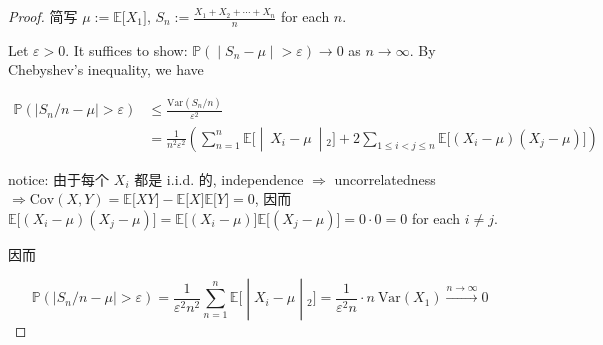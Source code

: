 \begin{proof}

简写 \(\mathit{\mu} := \mathbb{E}\lbrack\mathit{X}_{1}\rbrack\), \(\mathit{S}_{\mathit{n}} := \frac{\mathit{X}_{1} + \mathit{X}_{2} + \cdots + \mathit{X}_{\mathit{n}}}{\mathit{n}}\) for each \(\mathit{n}\).

Let \(\mathit{\varepsilon} > 0\). It suffices to show: \(\left. \mathbb{P}( \middle| \mathit{S}_{\mathit{n}} - \mathit{\mu} \middle| > \mathit{\varepsilon})\rightarrow 0 \right.\) as \(\mathit{n}\rightarrow\infty\). By Chebyshev's inequality, we have

\[\begin{matrix}
{\mathbb{P}\left( {\left| {\mathit{S}_{\mathit{n}}/\mathit{n} - \mathit{\mu}} \right| > \mathit{\varepsilon}} \right)} & {\leq \frac{\text{Var}(\mathit{S}_{\mathit{n}}/\mathit{n})}{\mathit{\varepsilon}^{2}}} \\
 & {= \frac{1}{\mathit{n}^{2}\mathit{\varepsilon}^{2}}\left( \sum\limits_{\mathit{n} = 1}^{\mathit{n}}\mathbb{E}\lbrack \middle| \ \mathit{X}_{\mathit{i}} - \mathit{\mu}\  \middle| {}_{2}\rbrack + 2\sum\limits_{1 \leq \mathit{i} < \mathit{j} \leq \mathit{n}}\mathbb{E}\lbrack(\mathit{X}_{\mathit{i}} - \mathit{\mu})(\mathit{X}_{\mathit{j}} - \mathit{\mu})\rbrack \right)}
\end{matrix}\]

notice: 由于每个 \(\mathit{X}_{\mathit{i}}\) 都是 i.i.d. 的, independence \(\Longrightarrow\) uncorrelatedness \(\Longrightarrow\text{Cov}(\mathit{X},\mathit{Y}) = \mathbb{E}\lbrack\mathit{X}\mathit{Y}\rbrack - \mathbb{E}\lbrack\mathit{X}\rbrack\mathbb{E}\lbrack\mathit{Y}\rbrack = 0\), 因而 \(\mathbb{E}\lbrack(\mathit{X}_{\mathit{i}} - \mathit{\mu})(\mathit{X}_{\mathit{j}} - \mathit{\mu})\rbrack = \mathbb{E}\lbrack(\mathit{X}_{\mathit{i}} - \mathit{\mu})\rbrack\mathbb{E}\lbrack(\mathit{X}_{\mathit{j}} - \mathit{\mu})\rbrack = 0 \cdot 0 = 0\) for each \(\mathit{i} \neq \mathit{j}\).

因而

\[\left. \mathbb{P}\left( {\left| {\mathit{S}_{\mathit{n}}/\mathit{n} - \mathit{\mu}} \right| > \mathit{\varepsilon}} \right) = \frac{1}{\mathit{\varepsilon}^{2}\mathit{n}^{2}}\sum\limits_{\mathit{n} = 1}^{\mathit{n}}\mathbb{E}\lbrack \middle| \mathit{X}_{\mathit{i}} - \mathit{\mu} \middle| {}_{2}\rbrack = \frac{1}{\mathit{\varepsilon}^{2}\mathit{n}} \cdot \mathit{n}\ \text{Var}(\mathit{X}_{1})\overset{\mathit{n}\rightarrow\infty}{\rightarrow}0 \right.\]

\end{proof}

